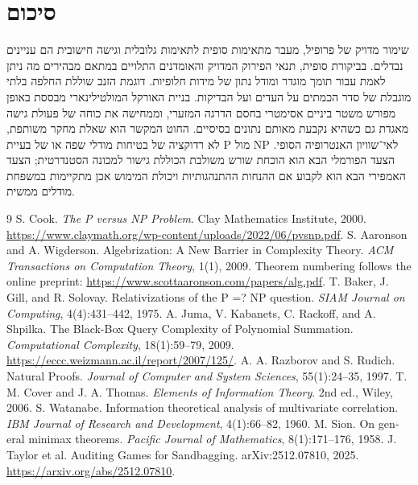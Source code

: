 \documentclass[11pt,a4paper]{article}
\theoremstyle{definition}
\theoremstyle{remark}
\newcommand{\EN}[1]{\textenglish{#1}}
\begin{document}
\section{סיכום}
שימור מדויק של פרופיל, מעבר מתאימות סופית לתאימות גלובלית וגישה חישובית הם עניינים נבדלים. בביקורת סופית, תנאי הפירוק המדויק והאומדנים התלויים במתאם מבהירים מה ניתן לאמת עבור תומך מוגדר ומודל נתון של מידות חלופיות. דוגמת הזנב שוללת החלפה בלתי מוגבלת של סדר הכמתים על העדים ועל הבדיקות. בניית האורקל המולטילינארי מבססת באופן מפורש משטר ביניים אסימטרי בחסם הדרגה המזערי, וממחישה את כוחה של פעולת גישה מאגדת גם כשהיא נקבעת מאותם נתונים בסיסיים. החוט המקשר הוא שאלת מחקר משותפת, לא רדוקציה של בטיחות מודלי שפה או של בעיית \EN{P} מול \EN{NP} לאי־שוויון האנטרופיה הסופי. הצעד הפורמלי הבא הוא הוכחת שורש משולבת הכוללת גישור למכונה הסטנדרטית; הצעד האמפירי הבא הוא לקבוע אם ההנחות ההתנהגותיות ויכולת המימוש אכן מתקיימות במשפחת מודלים ממשית.

\begin{english}
\renewcommand{\refname}{References}
\begin{thebibliography}{9}\small
{} S. Cook. \emph{The P versus NP Problem}. Clay Mathematics Institute, 2000. \url{https://www.claymath.org/wp-content/uploads/2022/06/pvsnp.pdf}.
 S. Aaronson and A. Wigderson. Algebrization: A New Barrier in Complexity Theory. \emph{ACM Transactions on Computation Theory}, 1(1), 2009. Theorem numbering follows the online preprint: \url{https://www.scottaaronson.com/papers/alg.pdf}.
 T. Baker, J. Gill, and R. Solovay. Relativizations of the P =? NP question. \emph{SIAM Journal on Computing}, 4(4):431--442, 1975.
 A. Juma, V. Kabanets, C. Rackoff, and A. Shpilka. The Black-Box Query Complexity of Polynomial Summation. \emph{Computational Complexity}, 18(1):59--79, 2009. \url{https://eccc.weizmann.ac.il/report/2007/125/}.
 A. A. Razborov and S. Rudich. Natural Proofs. \emph{Journal of Computer and System Sciences}, 55(1):24--35, 1997.
 T. M. Cover and J. A. Thomas. \emph{Elements of Information Theory}. 2nd ed., Wiley, 2006.
 S. Watanabe. Information theoretical analysis of multivariate correlation. \emph{IBM Journal of Research and Development}, 4(1):66--82, 1960.
 M. Sion. On general minimax theorems. \emph{Pacific Journal of Mathematics}, 8(1):171--176, 1958.
 J. Taylor et al. Auditing Games for Sandbagging. arXiv:2512.07810, 2025. \url{https://arxiv.org/abs/2512.07810}.
\end{thebibliography}
\end{english}
\end{document}
